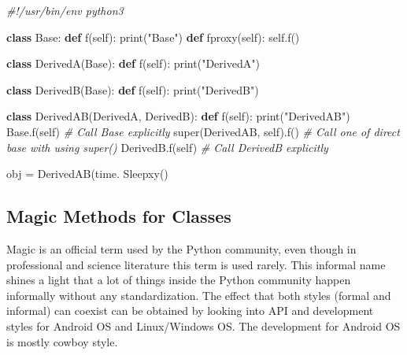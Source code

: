 \documentclass[
]{article}
\newenvironment{Shaded}{}{}
\newcommand{\BuiltInTok}[1]{#1}
\newcommand{\CommentTok}[1]{\textcolor[rgb]{0.38,0.63,0.69}{\textit{#1}}}
\newcommand{\KeywordTok}[1]{\textcolor[rgb]{0.00,0.44,0.13}{\textbf{#1}}}
\newcommand{\NormalTok}[1]{#1}
\newcommand{\OperatorTok}[1]{\textcolor[rgb]{0.40,0.40,0.40}{#1}}
\newcommand{\StringTok}[1]{\textcolor[rgb]{0.25,0.44,0.63}{#1}}
\newcommand{\VariableTok}[1]{\textcolor[rgb]{0.10,0.09,0.49}{#1}}
\begin{document}
\begin{Shaded}
\begin{Highlighting}[]

\CommentTok{\#!/usr/bin/env python3}

\KeywordTok{class}\NormalTok{ Base:}
  \KeywordTok{def}\NormalTok{ f(}\VariableTok{self}\NormalTok{): }\BuiltInTok{print}\NormalTok{(}\StringTok{"Base"}\NormalTok{)}
  \KeywordTok{def}\NormalTok{ fproxy(}\VariableTok{self}\NormalTok{): }\VariableTok{self}\NormalTok{.f() }

\KeywordTok{class}\NormalTok{ DerivedA(Base):}
  \KeywordTok{def}\NormalTok{ f(}\VariableTok{self}\NormalTok{): }\BuiltInTok{print}\NormalTok{(}\StringTok{"DerivedA"}\NormalTok{)}

\KeywordTok{class}\NormalTok{ DerivedB(Base):}
  \KeywordTok{def}\NormalTok{ f(}\VariableTok{self}\NormalTok{): }\BuiltInTok{print}\NormalTok{(}\StringTok{"DerivedB"}\NormalTok{)}


\KeywordTok{class}\NormalTok{ DerivedAB(DerivedA, DerivedB):}
  \KeywordTok{def}\NormalTok{ f(}\VariableTok{self}\NormalTok{): }
      \BuiltInTok{print}\NormalTok{(}\StringTok{"DerivedAB"}\NormalTok{)}
\NormalTok{      Base.f(}\VariableTok{self}\NormalTok{)                 }\CommentTok{\# Call Base explicitly}
      \BuiltInTok{super}\NormalTok{(DerivedAB, }\VariableTok{self}\NormalTok{).f()   }\CommentTok{\# Call one of direct base with using super()}
\NormalTok{      DerivedB.f(}\VariableTok{self}\NormalTok{)             }\CommentTok{\# Call DerivedB explicitly}

\NormalTok{obj }\OperatorTok{=}\NormalTok{ DerivedAB(time. Sleepxy()}
\end{Highlighting}
\end{Shaded}

\hypertarget{magic-methods-for-classes}{%
\subsection{Magic Methods for Classes}\label{magic-methods-for-classes}}

Magic is an official term used by the Python community, even though in
professional and science literature this term is used rarely. This
informal name shines a light that a lot of things inside the Python
community happen informally without any standardization. The effect that
both styles (formal and informal) can coexist can be obtained by looking
into API and development styles for Android OS and Linux/Windows OS. The
development for Android OS is mostly cowboy style.
\end{document}
